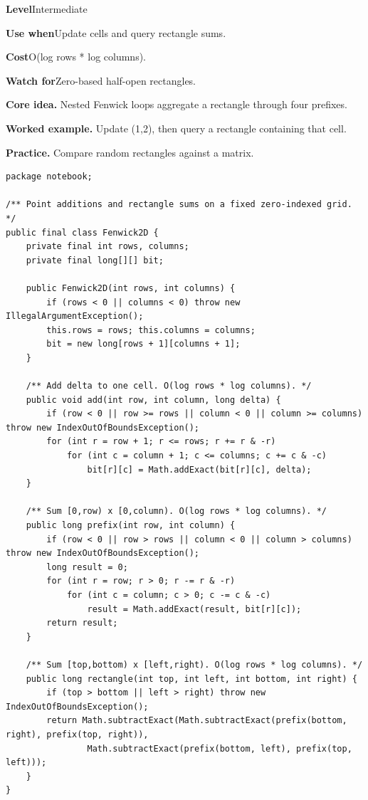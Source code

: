 \documentclass[10pt,letterpaper]{article}
\newcommand{\entrylabel}[1]{\textcolor{accent}{\bfseries #1}}
\begin{document}
\begin{guidebox}\small
\entrylabel{Level}\quad Intermediate\par
\entrylabel{Use when}\quad Update cells and query rectangle sums.\par
\entrylabel{Cost}\quad O(log rows * log columns).\par
\entrylabel{Watch for}\quad Zero-based half-open rectangles.\par
\end{guidebox}
\noindent\textbf{Core idea.} Nested Fenwick loops aggregate a rectangle through four prefixes.\par
\noindent\textbf{Worked example.} Update (1,2), then query a rectangle containing that cell.\par
\noindent\textbf{Practice.} Compare random rectangles against a matrix.\par
\begin{lstlisting}
package notebook;

/** Point additions and rectangle sums on a fixed zero-indexed grid. */
public final class Fenwick2D {
    private final int rows, columns;
    private final long[][] bit;

    public Fenwick2D(int rows, int columns) {
        if (rows < 0 || columns < 0) throw new IllegalArgumentException();
        this.rows = rows; this.columns = columns;
        bit = new long[rows + 1][columns + 1];
    }

    /** Add delta to one cell. O(log rows * log columns). */
    public void add(int row, int column, long delta) {
        if (row < 0 || row >= rows || column < 0 || column >= columns) throw new IndexOutOfBoundsException();
        for (int r = row + 1; r <= rows; r += r & -r)
            for (int c = column + 1; c <= columns; c += c & -c)
                bit[r][c] = Math.addExact(bit[r][c], delta);
    }

    /** Sum [0,row) x [0,column). O(log rows * log columns). */
    public long prefix(int row, int column) {
        if (row < 0 || row > rows || column < 0 || column > columns) throw new IndexOutOfBoundsException();
        long result = 0;
        for (int r = row; r > 0; r -= r & -r)
            for (int c = column; c > 0; c -= c & -c)
                result = Math.addExact(result, bit[r][c]);
        return result;
    }

    /** Sum [top,bottom) x [left,right). O(log rows * log columns). */
    public long rectangle(int top, int left, int bottom, int right) {
        if (top > bottom || left > right) throw new IndexOutOfBoundsException();
        return Math.subtractExact(Math.subtractExact(prefix(bottom, right), prefix(top, right)),
                Math.subtractExact(prefix(bottom, left), prefix(top, left)));
    }
}
\end{lstlisting}
\end{document}
